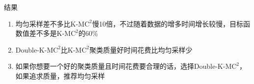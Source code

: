 \documentclass[notheorems]{beamer}
\begin{document}
\begin{CJK*}{UTF8}{gbsn}
\begin{frame}{结果}
	\begin{minipage}{0.4\linewidth}
		\scriptsize
		\begin{enumerate}
			\item 均匀采样差不多比K-M$\text{C}^2$慢10倍，不过随着数据的增多时间增长较慢，目标函数值差不多是K-M$\text{C}^2$的60\%
			\item Double-K-M$\text{C}^2$比K-M$\text{C}^2$聚类质量好时间花费比均匀采样少
			\item 如果你想要一个好的聚类质量且时间花费要合理的话，选择Double-K-M$\text{C}^2$，如果追求质量，推荐均匀采样
		\end{enumerate}
	\end{minipage}
\end{frame}
\end{CJK*}
\end{document}
